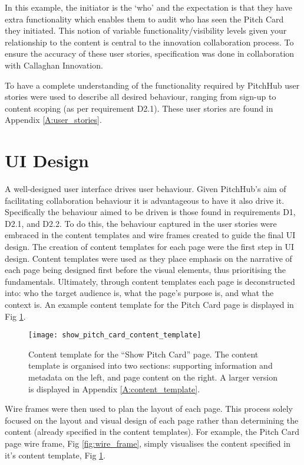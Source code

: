 In this example, the initiator is the `who' and the expectation is that they have extra functionality which enables them to audit who has seen the Pitch Card they initiated. This notion of variable functionality/visibility levels given your relationship to the content is central to the innovation collaboration process. To ensure the accuracy of these user stories, specification was done in collaboration with Callaghan Innovation. 

To have a complete understanding of the functionality required by PitchHub user stories were used to describe all desired behaviour, ranging from sign-up to content scoping (as per requirement D2.1). These user stories are found in Appendix \ref{A:user_stories}.


\section{UI Design}
A well-designed user interface drives user behaviour. Given PitchHub's aim of facilitating collaboration behaviour it is advantageous to have it also drive it. Specifically the behaviour aimed to be driven is those found in requirements D1, D2.1, and D2.2. To do this, the behaviour captured in the user stories were embraced in the content templates and wire frames created to guide the final UI design.
The creation of content templates for each page were the first step in UI design. Content templates were used as they place emphasis on the narrative of each page being designed first before the visual elements, thus prioritising the fundamentals. Ultimately, through content templates each page is deconstructed into: who the target audience is, what the page's purpose is, and what the context is. An example content template for the Pitch Card page is displayed in Fig \ref{fig:content_template}.

\begin{figure}[ht]
    \centering
    \texttt{[image: show\_pitch\_card\_content\_template]}
    \caption{Content template for the ``Show Pitch Card'' page. The content template is organised into two sections: supporting information and metadata on the left, and page content on the right. A larger version is displayed in Appendix \ref{A:content_template}.}
    \label{fig:content_template}
\end{figure}

Wire frames were then used to plan the layout of each page. This process solely focused on the layout and visual design of each page rather than determining the content (already specified in the content templates). For example, the Pitch Card page wire frame, Fig \ref{fig:wire_frame}, simply visualises the content specified in it's content template, Fig \ref{fig:content_template}.

